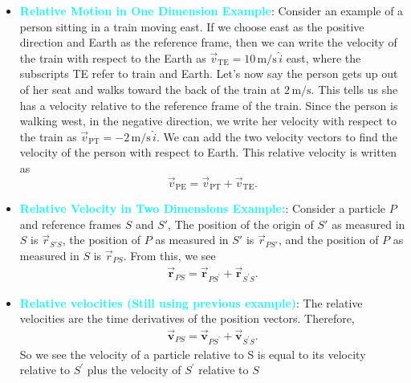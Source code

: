 \documentclass{report}
\begin{document}
\begin{itemize}
            \item \textbf{\textcolor{cyan}{Relative Motion in One Dimension Example}}:
                Consider an example of a person sitting in a train moving east. If we choose east as the positive direction and Earth as the reference frame, then we can write the velocity of the train with respect to the Earth as $\vec{v}_{\text{TE}} = 10 \, \text{m/s} \, \hat{i}$ east, where the subscripts TE refer to train and Earth. Let’s now say the person gets up out of her seat and walks toward the back of the train at $2 \, \text{m/s}$. This tells us she has a velocity relative to the reference frame of the train. Since the person is walking west, in the negative direction, we write her velocity with respect to the train as $\vec{v}_{\text{PT}} = -2 \, \text{m/s} \, \hat{i}$. We can add the two velocity vectors to find the velocity of the person with respect to Earth. This relative velocity is written as
                \[
                    \vec{v}_{\text{PE}} = \vec{v}_{\text{PT}} + \vec{v}_{\text{TE}}.
                \]
            \item \textbf{\textcolor{cyan}{Relative Velocity in Two Dimensions Example:}}:
                Consider a particle \(P\) and reference frames \(S\) and \(S'\), The position of the origin of \(S'\)
                as measured in \(S\) is \(\vec{r}_{S'S}\),
                the position of \(P\) as measured in \(S'\)
                is \(\vec{r}_{PS'}\),
                and the position of \(P\) as measured in \(S\) is \(\vec{r}_{PS}\).
                \bigbreak \noindent 
                \bigbreak \noindent 
                From this, we see 
                \begin{align*}
                    \vec{\mathbf{r}}_{PS} = \vec{\mathbf{r}}_{PS^{\prime}} + \vec{\mathbf{r}}_{S^{\prime}S}
                .\end{align*}
        \item \textbf{\textcolor{cyan}{Relative velocities (Still using previous example)}}: The relative velocities are the time derivatives of the position vectors. Therefore,
            \begin{align*}
                    \vec{\mathbf{v}}_{PS} = \vec{\mathbf{v}}_{PS^{\prime}} + \vec{\mathbf{v}}_{S^{\prime}S}
            .\end{align*}
            \bigbreak \noindent 
            So we see the velocity of a particle relative to S is equal to its velocity relative to  $S^{\prime}$ plus the velocity of $S^{\prime}$ relative to $S$

\end{itemize}
\end{document}
